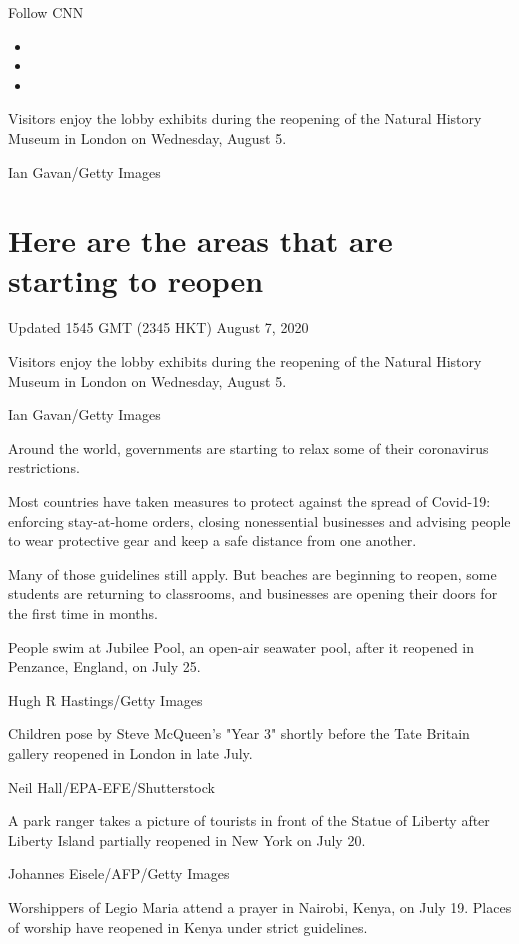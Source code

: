 Follow CNN

\begin{itemize}
\item
\item
\item
\end{itemize}

Visitors enjoy the lobby exhibits during the reopening of the Natural
History Museum in London on Wednesday, August 5.

Ian Gavan/Getty Images

\hypertarget{here-are-the-areas-that-are-starting-to-reopen}{%
\section{Here are the areas that are starting to
reopen}\label{here-are-the-areas-that-are-starting-to-reopen}}

Updated 1545 GMT (2345 HKT) August 7, 2020

Visitors enjoy the lobby exhibits during the reopening of the Natural
History Museum in London on Wednesday, August 5.

Ian Gavan/Getty Images

Around the world, governments are starting to relax some of their
coronavirus restrictions.

Most countries have taken measures to protect against the spread of
Covid-19: enforcing stay-at-home orders, closing nonessential businesses
and advising people to wear protective gear and keep a safe distance
from one another.

Many of those guidelines still apply. But beaches are beginning to
reopen, some students are returning to classrooms, and businesses are
opening their doors for the first time in months.

People swim at Jubilee Pool, an open-air seawater pool, after it
reopened in Penzance, England, on July 25.

Hugh R Hastings/Getty Images

Children pose by Steve McQueen's "Year 3" shortly before the Tate
Britain gallery reopened in London in late July.

Neil Hall/EPA-EFE/Shutterstock

A park ranger takes a picture of tourists in front of the Statue of
Liberty after Liberty Island partially reopened in New York on July 20.

Johannes Eisele/AFP/Getty Images

Worshippers of Legio Maria attend a prayer in Nairobi, Kenya, on July
19. Places of worship have reopened in Kenya under strict guidelines.

